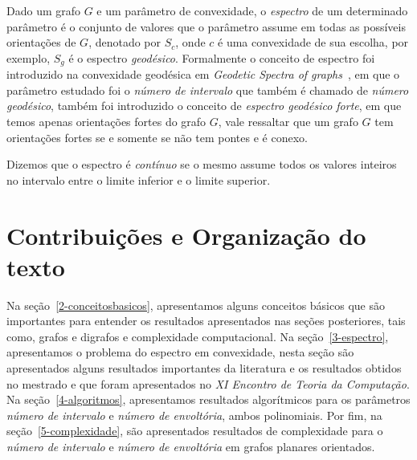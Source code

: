 Dado um grafo $G$ e um parâmetro de convexidade, o \emph{espectro} de um determinado parâmetro é o conjunto de valores que o parâmetro assume em todas as possíveis orientações de $G$, denotado por $S_c$, onde $c$ é uma convexidade de sua escolha, por exemplo, $S_g$ é o espectro \emph{geodésico}. Formalmente o conceito de espectro foi introduzido na convexidade geodésica em \textit{Geodetic Spectra of graphs}~\cite{CHANG2004}, em que o parâmetro estudado foi o \emph{número de intervalo} que também é chamado de \emph{número geodésico}, também foi introduzido o conceito de \emph{espectro geodésico forte}, em que temos apenas orientações fortes do grafo $G$, vale ressaltar que um grafo $G$ tem orientações fortes se e somente se não tem pontes e é conexo.

Dizemos que o espectro é \emph{contínuo} se o mesmo assume todos os valores inteiros no intervalo entre o limite inferior e o limite superior.

\section{Contribuições e Organização do texto}

Na seção~\ref{2-conceitosbasicos}, apresentamos alguns conceitos básicos que são importantes para entender os resultados apresentados nas seções posteriores, tais como, grafos e digrafos e complexidade computacional. Na seção~\ref{3-espectro}, apresentamos o problema do espectro em convexidade, nesta seção são apresentados alguns resultados importantes da literatura e os resultados obtidos no mestrado e que foram apresentados no \emph{XI Encontro de Teoria da Computação}. Na seção~\ref{4-algoritmos}, apresentamos resultados algorítmicos para os parâmetros \emph{número de intervalo} e \emph{número de envoltória}, ambos polinomiais. Por fim, na seção~\ref{5-complexidade}, são apresentados resultados de complexidade para o \emph{número de intervalo} e \emph{número de envoltória} em grafos planares orientados.